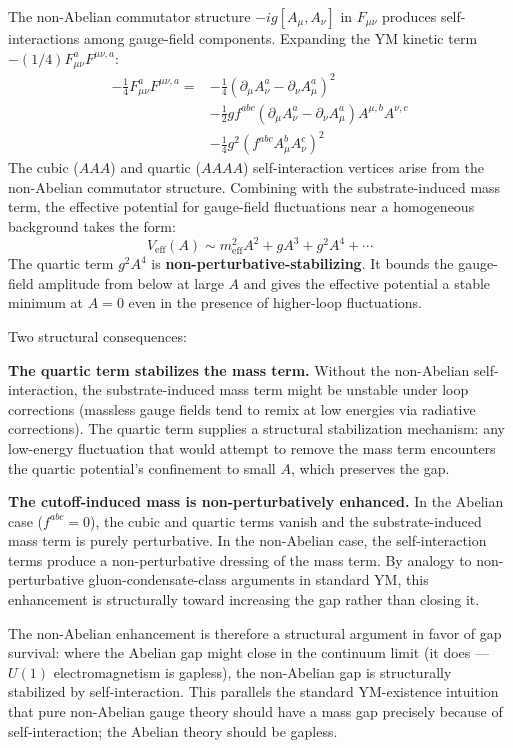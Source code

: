 \documentclass[11pt,a4paper]{article}
\begin{document}
The non-Abelian commutator structure $-ig[A_\mu, A_\nu]$ in $F_{\mu\nu}$ produces self-interactions among gauge-field components. Expanding the YM kinetic term $-(1/4) F_{\mu\nu}^a F^{\mu\nu,a}$:
\[
\begin{aligned}
-\tfrac{1}{4} F_{\mu\nu}^a F^{\mu\nu,a} = &-\tfrac{1}{4}(\partial_\mu A_\nu^a - \partial_\nu A_\mu^a)^{2} \\
&- \tfrac{1}{2} g f^{abc} (\partial_\mu A_\nu^a - \partial_\nu A_\mu^a) A^{\mu,b} A^{\nu,c} \\
&- \tfrac{1}{4} g^{2} (f^{abc} A_\mu^b A_\nu^c)^{2}
\end{aligned}
\]
The cubic ($AAA$) and quartic ($AAAA$) self-interaction vertices arise from the non-Abelian commutator structure. Combining with the substrate-induced mass term, the effective potential for gauge-field fluctuations near a homogeneous background takes the form:
\[
V_\mathrm{eff}(A) \sim m_\mathrm{eff}^{2} A^{2} + g A^{3} + g^{2} A^{4} + \cdots
\]
The quartic term $g^{2} A^{4}$ is \textbf{non-perturbative-stabilizing}. It bounds the gauge-field amplitude from below at large $A$ and gives the effective potential a stable minimum at $A = 0$ even in the presence of higher-loop fluctuations.

Two structural consequences:

\textbf{The quartic term stabilizes the mass term.} Without the non-Abelian self-interaction, the substrate-induced mass term might be unstable under loop corrections (massless gauge fields tend to remix at low energies via radiative corrections). The quartic term supplies a structural stabilization mechanism: any low-energy fluctuation that would attempt to remove the mass term encounters the quartic potential's confinement to small $A$, which preserves the gap.

\textbf{The cutoff-induced mass is non-perturbatively enhanced.} In the Abelian case ($f^{abc} = 0$), the cubic and quartic terms vanish and the substrate-induced mass term is purely perturbative. In the non-Abelian case, the self-interaction terms produce a non-perturbative dressing of the mass term. By analogy to non-perturbative gluon-condensate-class arguments in standard YM, this enhancement is structurally toward increasing the gap rather than closing it.

The non-Abelian enhancement is therefore a structural argument in favor of gap survival: where the Abelian gap might close in the continuum limit (it does --- $U(1)$ electromagnetism is gapless), the non-Abelian gap is structurally stabilized by self-interaction. This parallels the standard YM-existence intuition that pure non-Abelian gauge theory should have a mass gap precisely because of self-interaction; the Abelian theory should be gapless.
\end{document}
